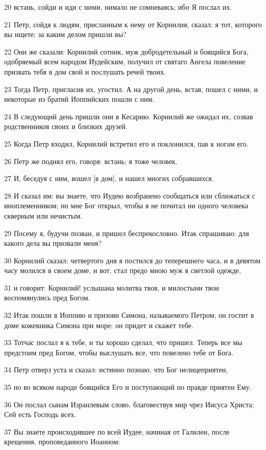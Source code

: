 \par 20 встань, сойди и иди с ними, нимало не сомневаясь; ибо Я послал их.
\par 21 Петр, сойдя к людям, присланным к нему от Корнилия, сказал: я тот, которого вы ищете; за каким делом пришли вы?
\par 22 Они же сказали: Корнилий сотник, муж добродетельный и боящийся Бога, одобряемый всем народом Иудейским, получил от святаго Ангела повеление призвать тебя в дом свой и послушать речей твоих.
\par 23 Тогда Петр, пригласив их, угостил. А на другой день, встав, пошел с ними, и некоторые из братий Иоппийских пошли с ним.
\par 24 В следующий день пришли они в Кесарию. Корнилий же ожидал их, созвав родственников своих и близких друзей.
\par 25 Когда Петр входил, Корнилий встретил его и поклонился, пав к ногам его.
\par 26 Петр же поднял его, говоря: встань; я тоже человек.
\par 27 И, беседуя с ним, вошел [в дом], и нашел многих собравшихся.
\par 28 И сказал им: вы знаете, что Иудею возбранено сообщаться или сближаться с иноплеменником; но мне Бог открыл, чтобы я не почитал ни одного человека скверным или нечистым.
\par 29 Посему я, будучи позван, и пришел беспрекословно. Итак спрашиваю: для какого дела вы призвали меня?
\par 30 Корнилий сказал: четвертого дня я постился до теперешнего часа, и в девятом часу молился в своем доме, и вот, стал предо мною муж в светлой одежде,
\par 31 и говорит: Корнилий! услышана молитва твоя, и милостыни твои воспомянулись пред Богом.
\par 32 Итак пошли в Иоппию и призови Симона, называемого Петром; он гостит в доме кожевника Симона при море; он придет и скажет тебе.
\par 33 Тотчас послал я к тебе, и ты хорошо сделал, что пришел. Теперь все мы предстоим пред Богом, чтобы выслушать все, что повелено тебе от Бога.
\par 34 Петр отверз уста и сказал: истинно познаю, что Бог нелицеприятен,
\par 35 но во всяком народе боящийся Его и поступающий по правде приятен Ему.
\par 36 Он послал сынам Израилевым слово, благовествуя мир чрез Иисуса Христа; Сей есть Господь всех.
\par 37 Вы знаете происходившее по всей Иудее, начиная от Галилеи, после крещения, проповеданного Иоанном:
